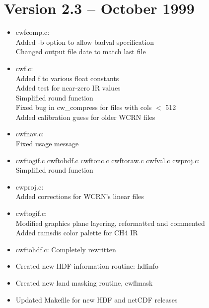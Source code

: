 
\section{Version 2.3 -- October 1999}

\begin{itemize}

  \item cwfcomp.c:\\
   Added -b option to allow badval specification\\
   Changed output file date to match last file

  \item cwf.c:\\
   Added f to various float constants\\
   Added test for near-zero IR values\\
   Simplified round function\\
   Fixed bug in cw\_compress for files with cols $<$ 512\\
   Added calibration guess for older WCRN files

  \item cwfnav.c:\\
   Fixed usage message

  \item cwftogif.c cwftohdf.c cwftonc.c cwftoraw.c cwfval.c cwproj.c:\\
   Simplified round function

  \item cwproj.c:\\
   Added corrections for WCRN's linear files

  \item cwftogif.c: \\
  Modified graphics plane layering, reformatted and commented\\
  Added ramsdis color palette for CH4 IR

  \item cwftohdf.c: Completely rewritten

  \item Created new HDF information routine: hdfinfo

  \item Created new land masking routine, cwflmask

  \item Updated Makefile for new HDF and netCDF releases

\end{itemize}

